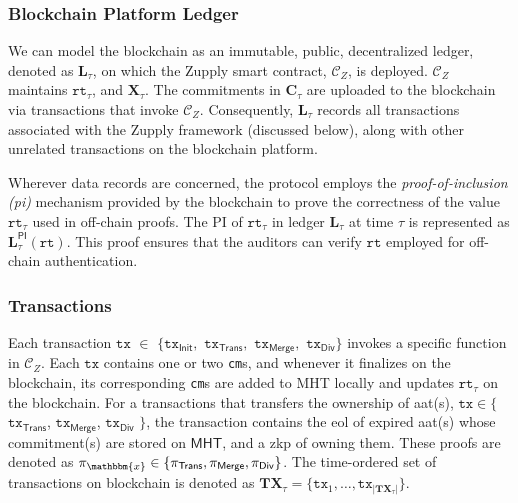 \subsubsection{Blockchain Platform Ledger}
We can model the blockchain as an immutable, public, decentralized ledger, denoted as $\mathbf{L}_\tau$, on which the Zupply smart contract, $\mathcal{C}_Z$, is deployed.  $\mathcal{C}_Z$ maintains $\texttt{rt}_\tau$, and $\mathbf{X}_\tau$. The commitments in $\mathbf{C}_\tau$ are uploaded to the blockchain via transactions that invoke $\mathcal{C}_Z$. Consequently, $\mathbf{L}_\tau$ records all transactions associated with the Zupply framework (discussed below), along with other unrelated transactions on the blockchain platform.

Wherever data records are concerned, the protocol employs the \textit{proof-of-inclusion (\gls{pi})} mechanism provided by the blockchain to prove the correctness of the value $\texttt{rt}_\tau$ used in off-chain proofs. The PI of $\texttt{rt}_\tau$ in ledger $\mathbf{L}_\tau$ at time $\tau$ is represented as $\mathbf{L}_\tau^\mathsf{PI}(\texttt{rt})$. This proof ensures that the auditors can  verify  $\texttt{rt}$ employed for off-chain authentication.  

\subsubsection{Transactions}
Each transaction  $\texttt{tx}$ $\in$ $\{ \texttt{tx}_\textsf{Init},$ $\texttt{tx}_\textsf{Trans},$ $\texttt{tx}_\textsf{Merge},$ $\texttt{tx}_\textsf{Div} \}$ invokes a specific function in $\mathcal{C}_Z$. Each $\texttt{tx}$ contains one or two \texttt{cm}s, and whenever it finalizes on the blockchain,  its corresponding \texttt{cm}s are added to \textsf{MHT} locally and updates $\texttt{rt}_\tau$  on the blockchain. For a transactions that transfers the ownership of \gls{aat}(s), $\texttt{tx} \in \{$$\texttt{tx}_\textsf{Trans}$, $\texttt{tx}_\textsf{Merge}$, $\texttt{tx}_\textsf{Div}$ $\}$, the transaction contains the \gls{eol} of expired \gls{aat}(s) whose commitment(s) are stored on $\mathsf{MHT}$, and a \gls{zkp} of owning them. These proofs are denoted as $\pi_\mathbbm{x} \in \{\pi_\textsf{Trans}, \pi_\textsf{Merge}, \pi_\textsf{Div} \}$. 
The time-ordered set of transactions on blockchain is denoted as $\mathbf{TX}_\tau = \{\texttt{tx}_1, \dots, \texttt{tx}_{|\mathbf{TX}_\tau|}\}$.


